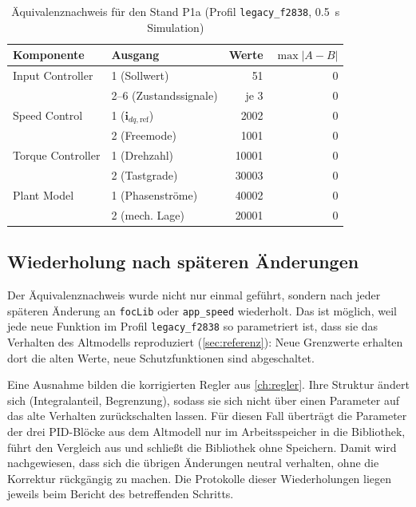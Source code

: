 \begin{table}[htbp]
  \centering
  \caption{Äquivalenznachweis für den Stand P1a (Profil \texttt{legacy\_f2838},
    \SI{0,5}{\second} Simulation)}
  \label{tab:aequivalenz}
  \small
  \begin{tabular}{@{}llrr@{}}
    \toprule
    Komponente & Ausgang & Werte & $\max |A - B|$ \\
    \midrule
    Input Controller & 1 (Sollwert) & 51 & 0 \\
                     & 2--6 (Zustandssignale) & je 3 & 0 \\
    Speed Control & 1 ($\boldsymbol{i}_{dq,\mathrm{ref}}$) & 2002 & 0 \\
                  & 2 (Freemode) & 1001 & 0 \\
    Torque Controller & 1 (Drehzahl) & 10001 & 0 \\
                      & 2 (Tastgrade) & 30003 & 0 \\
    Plant Model & 1 (Phasenströme) & 40002 & 0 \\
                & 2 (mech. Lage) & 20001 & 0 \\
    \bottomrule
  \end{tabular}
\end{table}

\subsection{Wiederholung nach späteren Änderungen}

Der Äquivalenznachweis wurde nicht nur einmal geführt, sondern nach jeder späteren Änderung
an \texttt{focLib} oder \texttt{app\_speed} wiederholt. Das ist möglich, weil jede neue
Funktion im Profil \texttt{legacy\_f2838} so parametriert ist, dass sie das Verhalten des
Altmodells reproduziert (\cref{sec:referenz}): Neue Grenzwerte erhalten dort die alten
Werte, neue Schutzfunktionen sind abgeschaltet.

Eine Ausnahme bilden die korrigierten Regler aus \cref{ch:regler}. Ihre Struktur ändert sich
(Integralanteil, Begrenzung), sodass sie sich nicht über einen Parameter auf das alte
Verhalten zurückschalten lassen. Für diesen Fall überträgt 
die Parameter der drei PID-Blöcke aus dem Altmodell nur im Arbeitsspeicher in die
Bibliothek, führt den Vergleich aus und schließt die Bibliothek ohne Speichern. Damit wird
nachgewiesen, dass sich die übrigen Änderungen neutral verhalten, ohne die Korrektur
rückgängig zu machen. Die Protokolle dieser Wiederholungen liegen jeweils beim Bericht des
betreffenden Schritts.


